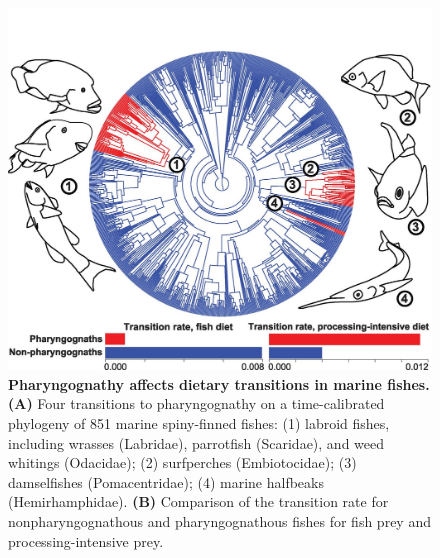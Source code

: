 \begin{figure}
    \centering
    \includegraphics[width=\textwidth]{FishJaws/figures/fig1}
    \caption{\textbf{Pharyngognathy affects dietary transitions in marine fishes.} \textbf{(A)} Four transitions to pharyngognathy on a time-calibrated phylogeny of 851 marine spiny-finned fishes: (1) labroid fishes, including wrasses (Labridae), parrotfish (Scaridae), and weed whitings (Odacidae); (2) surfperches (Embiotocidae); (3) damselfishes (Pomacentridae); (4) marine halfbeaks (Hemirhamphidae). \textbf{(B)} Comparison of the transition rate for nonpharyngognathous and pharyngognathous fishes for fish prey and processing-intensive prey.}
    \label{FJ_fig1}
\end{figure}